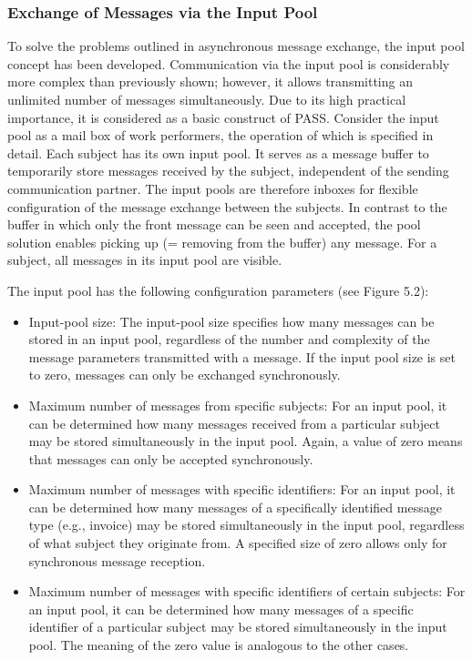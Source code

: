 \subsubsection{Exchange of Messages via the Input Pool}
To solve the problems outlined in asynchronous message exchange, the input pool concept has been developed. Communication via the input pool is considerably more complex than previously shown; however, it allows transmitting an unlimited number of messages simultaneously. Due to its high practical importance, it is considered as a basic construct of PASS.
Consider the input pool as a mail box of work performers, the operation of which is specified in detail.
Each subject has its own input pool. It serves as a message buffer to temporarily store messages received by the subject, independent of the sending communication partner. The input pools are therefore inboxes for flexible configuration of the message exchange between the subjects. In contrast to the buffer in which only the front message can be seen and accepted, the pool solution enables picking up (= removing from the buffer) any message. For a subject, all messages in its input pool are visible.

The input pool has the following configuration parameters (see \figurename{Figure 5.2}):
\begin{itemize}
	\item Input-pool size: The input-pool size specifies how many messages can be stored in an input pool, regardless of the number and complexity of the message parameters transmitted with a message. If the input pool size is set to zero, messages can only be exchanged synchronously.
	\item Maximum number of messages from specific subjects: For an input pool, it can be determined how many messages received from a particular subject may be stored simultaneously in the input pool. Again, a value of zero means that messages can only be accepted synchronously.
	\item Maximum number of messages with specific identifiers: For an input pool, it can be determined how many messages of a specifically identified message type (e.g., invoice) may be stored simultaneously in the input pool, regardless of what subject they originate from. A specified size of zero allows only for synchronous message reception.
	\item Maximum number of messages with specific identifiers of certain subjects: For an input pool, it can be determined how many messages of a specific identifier of a particular subject may be stored simultaneously in the input pool. The meaning of the zero value is analogous to the other cases.
\end{itemize}

